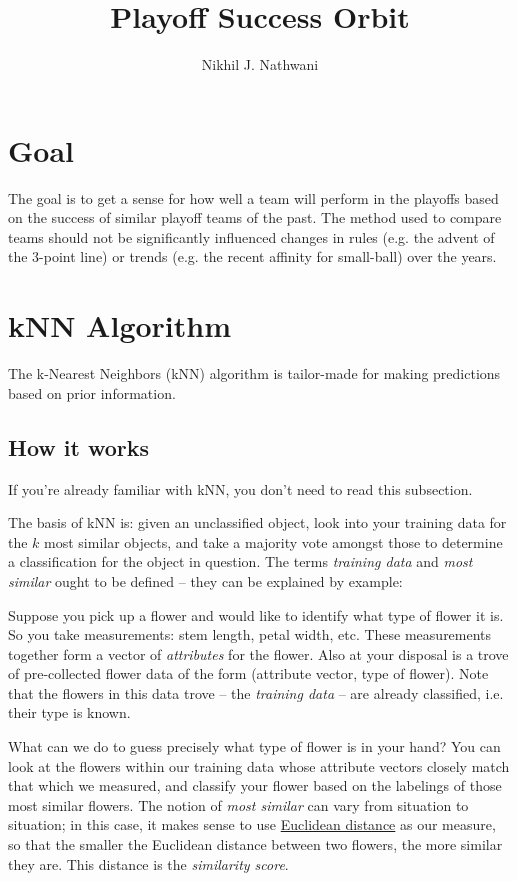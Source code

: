 \documentclass[a4paper,11pt]{article}
\author{Nikhil J. Nathwani}
\title{Playoff Success Orbit}
\begin{document}
       \maketitle

\section{Goal}
	The goal is to get a sense for how well a team will perform in the playoffs based on the success of similar playoff teams of the past. The method used to compare teams should not be significantly influenced changes in rules (e.g. the advent of the 3-point line) or trends (e.g. the recent affinity for small-ball) over the years.

\section{kNN Algorithm}
	The k-Nearest Neighbors (kNN) algorithm is tailor-made for making predictions based on prior information.

\subsection{How it works}
If you're already familiar with kNN, you don't need to read this subsection.

The basis of kNN is: given an unclassified object, look into your training data for the $k$ most similar objects, and take a majority vote amongst those to determine a classification for the object in question. The terms \emph{training data} and \emph{most similar} ought to be defined -- they can be explained by example:

Suppose you pick up a flower and would like to identify what type of flower it is. So you take measurements: stem length, petal width, etc. These measurements together form a vector of \emph{attributes} for the flower. Also at your disposal is a trove of pre-collected flower data of the form (attribute vector, type of flower). Note that the flowers in this data trove -- the \emph{training data} -- are already classified, i.e. their type is known.

What can we do to guess precisely what type of flower is in your hand? You can look at the flowers within our training data whose attribute vectors closely match that which we measured, and classify your flower based on the labelings of those most similar flowers. The notion of \emph{most similar} can vary from situation to situation; in this case, it makes sense to use \href{http://en.wikipedia.org/wiki/Euclidean_distance}{Euclidean distance} as our measure, so that the smaller the Euclidean distance between two flowers, the more similar they are. This distance is the \emph{similarity score}.
\end{document}
